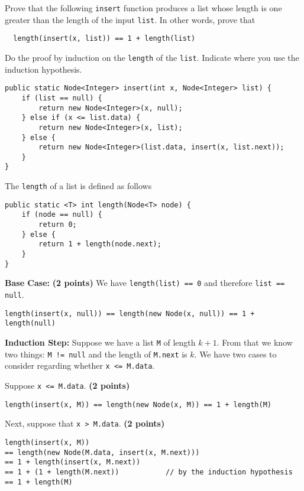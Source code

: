 \documentclass[12pt,answers]{exam}
\begin{document}
\begin{questions}

  \question[6] Prove that the following \texttt{insert} function
produces a list whose length is one greater than the length of the
input \texttt{list}. In other words, prove that
\begin{lstlisting}
  length(insert(x, list)) == 1 + length(list)
\end{lstlisting}

\noindent Do the proof by induction on the \texttt{length} of the
\texttt{list}. Indicate where you use the induction hypothesis.

\begin{lstlisting}
public static Node<Integer> insert(int x, Node<Integer> list) {
    if (list == null) {
        return new Node<Integer>(x, null);
    } else if (x <= list.data) {
        return new Node<Integer>(x, list);
    } else {
        return new Node<Integer>(list.data, insert(x, list.next));
    }
}
\end{lstlisting}
The \texttt{length} of a list is defined as follows
\begin{lstlisting}
public static <T> int length(Node<T> node) {
    if (node == null) {
        return 0;
    } else {
        return 1 + length(node.next);
    }
}
\end{lstlisting}

\begin{solution}
  \scriptsize
  
\textbf{Base Case:} \textbf{(2 points)}
We have \texttt{length(list) == 0} and therefore \texttt{list == null}.
\begin{lstlisting}
length(insert(x, null)) == length(new Node(x, null)) == 1 + length(null)
\end{lstlisting}

\textbf{Induction Step:}
Suppose we have a list \texttt{M} of length $k + 1$.
From that we know two things: \texttt{M != null}
and the length of \texttt{M.next} is $k$.
We have two cases to consider regarding whether \texttt{x <= M.data}.

Suppose \texttt{x <= M.data}. \textbf{(2 points)}
\begin{lstlisting}
length(insert(x, M)) == length(new Node(x, M)) == 1 + length(M)
\end{lstlisting}


Next, suppose that \texttt{x > M.data}.  \textbf{(2 points)}
\begin{lstlisting}
length(insert(x, M))
== length(new Node(M.data, insert(x, M.next)))
== 1 + length(insert(x, M.next))
== 1 + (1 + length(M.next))           // by the induction hypothesis
== 1 + length(M)
\end{lstlisting}

  
\end{solution}
\end{questions}
\end{document}
